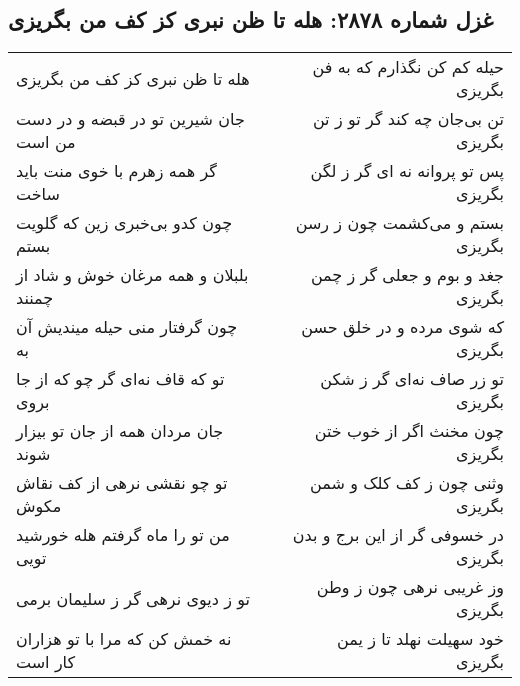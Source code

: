 \begin{center}
\section*{غزل شماره ۲۸۷۸: هله تا ظن نبری کز کف من بگریزی}
\label{sec:2878}
\begin{longtable}{l p{0.5cm} r}
هله تا ظن نبری کز کف من بگریزی
&&
حیله کم کن نگذارم که به فن بگریزی
\\
جان شیرین تو در قبضه و در دست من است
&&
تن بی‌جان چه کند گر تو ز تن بگریزی
\\
گر همه زهرم با خوی منت باید ساخت
&&
پس تو پروانه نه ای گر ز لگن بگریزی
\\
چون کدو بی‌خبری زین که گلویت بستم
&&
بستم و می‌کشمت چون ز رسن بگریزی
\\
بلبلان و همه مرغان خوش و شاد از چمنند
&&
جغد و بوم و جعلی گر ز چمن بگریزی
\\
چون گرفتار منی حیله میندیش آن به
&&
که شوی مرده و در خلق حسن بگریزی
\\
تو که قاف نه‌ای گر چو که از جا بروی
&&
تو زر صاف نه‌ای گر ز شکن بگریزی
\\
جان مردان همه از جان تو بیزار شوند
&&
چون مخنث اگر از خوب ختن بگریزی
\\
تو چو نقشی نرهی از کف نقاش مکوش
&&
وثنی چون ز کف کلک و شمن بگریزی
\\
من تو را ماه گرفتم هله خورشید تویی
&&
در خسوفی گر از این برج و بدن بگریزی
\\
تو ز دیوی نرهی گر ز سلیمان برمی
&&
وز غریبی نرهی چون ز وطن بگریزی
\\
نه خمش کن که مرا با تو هزاران کار است
&&
خود سهیلت نهلد تا ز یمن بگریزی
\\
\end{longtable}
\end{center}
